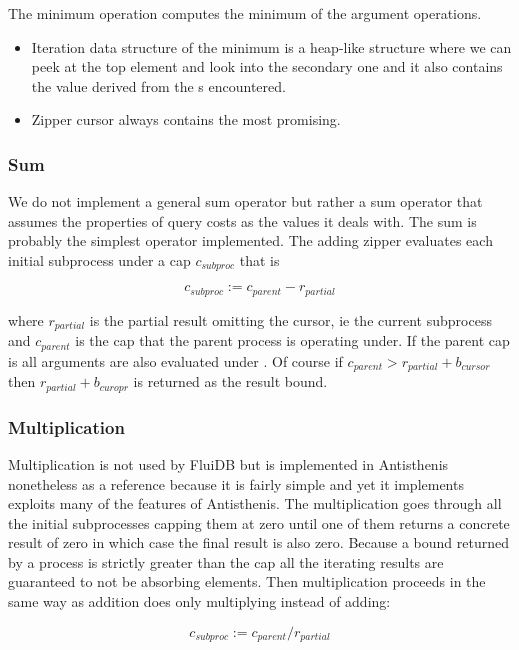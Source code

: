 The minimum operation computes the minimum of the argument
operations.

\begin{itemize}
\item Iteration data structure of the minimum is a heap-like structure
  where we can peek at the top element and look into the secondary one
  and it also contains the value derived from the s encountered.
\item Zipper cursor always contains the most promising.
\end{itemize}

\subsubsection{Sum}

We do not implement a general sum operator but rather a sum operator
that assumes the properties of query costs as the values it deals
with. The sum is probably the simplest operator implemented. The
adding zipper evaluates each initial subprocess under a cap
\(c_{subproc}\) that is

\[
c_{subproc} := c_{parent} - r_{partial}
\]

where \(r_{partial}\) is the partial result omitting the cursor, ie
the current subprocess and \(c_{parent}\) is the cap that the parent
process is operating under. If the parent cap is  all
arguments are also evaluated under . Of course if
\(c_{parent} > r_{partial} + b_{cursor}\) then \(r_{partial} +
b_{curopr}\) is returned as the result bound.

\subsubsection{Multiplication}

Multiplication is not used by FluiDB but is implemented in Antisthenis
nonetheless as a reference because it is fairly simple and yet it
implements exploits many of the features of Antisthenis. The
multiplication goes through all the initial subprocesses capping them
at zero until one of them returns a concrete result of zero in which
case the final result is also zero. Because a bound returned by a
process is strictly greater than the cap all the iterating results are
guaranteed to not be absorbing elements. Then multiplication proceeds
in the same way as addition does only multiplying instead of adding:

\[
c_{subproc} := c_{parent} / r_{partial}
\]

